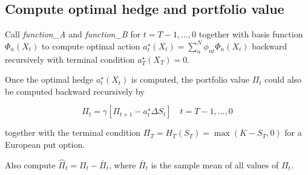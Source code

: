 \documentclass[11pt]{article}
\begin{document}
    \subsection{Compute optimal hedge and portfolio
value}\label{compute-optimal-hedge-and-portfolio-value}

    Call \emph{function\_A} and \emph{function\_B} for \(t=T-1,...,0\)
together with basis function \(\Phi_n\left(X_t\right)\) to compute
optimal action
\(a_t^\star\left(X_t\right)=\sum_n^N{\phi_{nt}\Phi_n\left(X_t\right)}\)
backward recursively with terminal condition
\(a_T^\star\left(X_T\right)=0\).

Once the optimal hedge \(a_t^\star\left(X_t\right)\) is computed, the
portfolio value \(\Pi_t\) could also be computed backward recursively by

\[\Pi_t=\gamma\left[\Pi_{t+1}-a_t^\star\Delta S_t\right]\quad t=T-1,...,0\]

together with the terminal condition
\(\Pi_T=H_T\left(S_T\right)=\max\left(K-S_T,0\right)\) for a European
put option.

Also compute \(\hat{\Pi}_t=\Pi_t-\bar{\Pi}_t\), where \(\bar{\Pi}_t\) is
the sample mean of all values of \(\Pi_t\).
\end{document}

